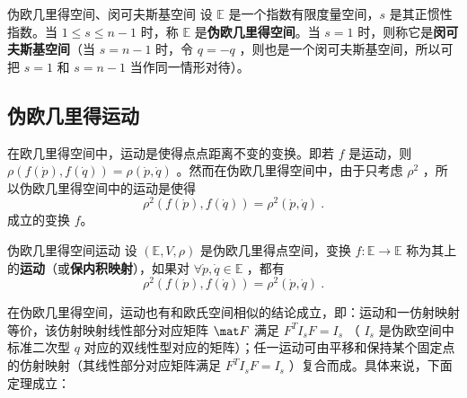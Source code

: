 \begin{definition}{伪欧几里得空间、闵可夫斯基空间}\label{def_EFSp_1}
设 $\mathbb E$ 是一个指数有限度量空间，$s$ 是其正惯性指数。当 $1\leq s\leq n-1$ 时，称 $\mathbb E$ 是\textbf{伪欧几里得空间}。当 $s=1$ 时，则称它是\textbf{闵可夫斯基空间}（当 $s=n-1$ 时，令 $q=-q$ ，则也是一个闵可夫斯基空间，所以可把 $s=1$ 和 $s=n-1$ 当作同一情形对待）。
\end{definition}
\subsection{伪欧几里得运动}
在欧几里得空间中，运动是使得点点距离不变的变换。即若 $f$ 是运动，则 $\rho(f(\dot p),f(\dot q))=\rho(\dot p,\dot q)$ 。然而在伪欧几里得空间中，由于只考虑 $\rho^2$ ，所以伪欧几里得空间中的运动是使得
\begin{equation}
\rho^2(f(\dot p),f(\dot q))=\rho^2(\dot p,\dot q)~.
\end{equation}
成立的变换 $f$。
\begin{definition}{伪欧几里得空间运动}
设 $(\mathbb E,V,\rho)$ 是伪欧几里得点空间，变换 $f:\mathbb E\rightarrow\mathbb E$ 称为其上的\textbf{运动}（或\textbf{保内积映射}），如果对 $\forall \dot p,\dot q\in\mathbb E$ ，都有
\begin{equation}
\rho^2(f(\dot p),f(\dot q))=\rho^2(\dot p,\dot q)~.
\end{equation}
\end{definition}
在伪欧几里得空间，运动也有和欧氏空间相似的结论成立，即：运动和一仿射映射等价，该仿射映射线性部分对应矩阵 $\mat F$ 满足 $F^TI_sF=I_s$ （ $I_s$ 是伪欧空间中标准二次型 $q$ 对应的双线性型对应的矩阵）；任一运动可由平移和保持某个固定点的仿射映射（其线性部分对应矩阵满足 $F^TI_sF=I_s$ ）复合而成。具体来说，下面定理成立：
\begin{theorem}{}

\end{theorem}
